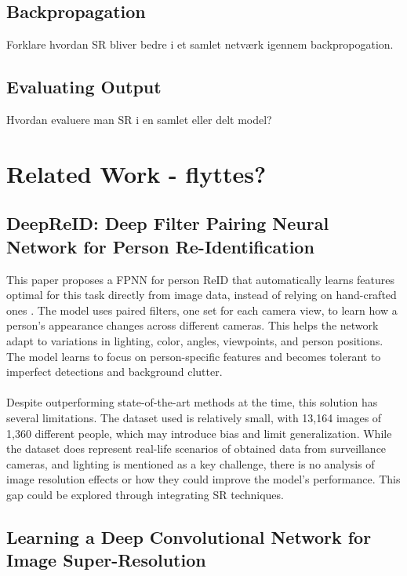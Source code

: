 \subsection{Backpropagation}
Forklare hvordan SR bliver bedre i et samlet netværk igennem backpropogation. 

\subsection{Evaluating Output}
Hvordan evaluere man SR i en samlet eller delt model?


\section{Related Work - flyttes?}\label{sec: related work}

\subsection{DeepReID: Deep Filter Pairing Neural Network for Person Re-Identification}

This paper proposes a \ac{FPNN} for person \ac{ReID} that automatically learns features optimal for this task directly from image data, instead of relying on hand-crafted ones \cite{FPNN}. The model uses paired filters, one set for each camera view, to learn how a person’s appearance changes across different cameras. This helps the network adapt to variations in lighting, color, angles, viewpoints, and person positions. The model learns to focus on person-specific features and becomes tolerant to imperfect detections and background clutter. 
\\\\
Despite outperforming state-of-the-art methods at the time, this solution has several limitations. The dataset used is relatively small, with 13,164 images of 1,360 different people, which may introduce bias and limit generalization. While the dataset does represent real-life scenarios of obtained data from surveillance cameras, and lighting is mentioned as a key challenge, there is no analysis of image resolution effects or how they could improve the model’s performance. This gap could be explored through integrating \ac{SR} techniques.  

\subsection{Learning a Deep Convolutional Network for Image Super-Resolution}

